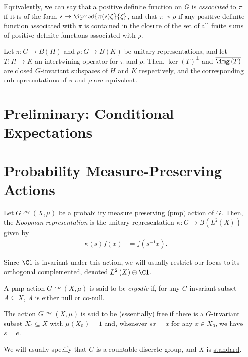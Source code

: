 \documentclass[10pt]{mypackage}
\begin{document}
Equivalently, we can say that a positive definite function on $G$ is \textit{associated} to $\pi$ if it is of the form $s\mapsto \iprod{\pi(s)\xi}{\xi}$, and that $\pi\prec \rho$ if any positive definite function associated with $\pi$ is contained in the closure of the set of all finite sums of positive definite functions associated with $\rho$.
\begin{lemma}
  Let $\pi\colon G\rightarrow B\left( H \right)$ and $\rho\colon G\rightarrow B\left( K \right)$ be unitary representations, and let $T\colon H\rightarrow K$ an intertwining operator for $\pi$ and $\rho$. Then, $ \ker\left( T \right)^{\perp} $ and $ \overline{\img\left( T \right)} $ are closed $G$-invariant subspaces of $H$ and $K$ respectively, and the corresponding subrepresentations of $\pi$ and $\rho$ are equivalent.
\end{lemma}
\section{Preliminary: Conditional Expectations}%

\section{Probability Measure-Preserving Actions}%
\begin{definition}
  Let $G\curvearrowright \left( X,\mu \right)$ be a probability measure preserving (pmp) action of $G$. Then, the \textit{Koopman representation} is the unitary representation $\kappa\colon G\rightarrow B\left( L^2\left( X \right) \right)$ given by
  \begin{align*}
    \kappa\left( s \right)f(x) &= f\left( s^{-1}x \right).
  \end{align*}
\end{definition}
Since $\C 1$ is invariant under this action, we will usually restrict our focus to its orthogonal complemented, denoted $L^2\left( X \right)\ominus \C 1$.
\begin{definition}
  A pmp action $G\curvearrowright \left( X,\mu \right)$ is said to be \textit{ergodic} if, for any $G$-invariant subset $A\subseteq X$, $A$ is either null or co-null.
\end{definition}
\begin{definition}
  The action $G\curvearrowright \left( X,\mu \right)$ is said to be (essentially) free if there is a $G$-invariant subset $X_0\subseteq X$ with $\mu\left( X_0 \right) = 1$ and, whenever $sx = x$ for any $x\in X_0$, we have $s = e$.
\end{definition}
We will usually specify that $G$ is a countable discrete group, and $X$ is \href{https://ai-bearing.github.io/Classes_and_Homework/After\%20College/Other\%20Notes/orbit_equivalence.pdf}{standard}.
\end{document}
